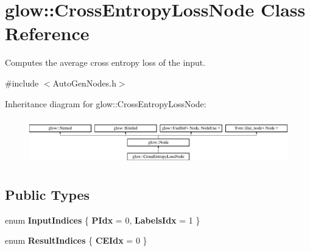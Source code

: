 \hypertarget{classglow_1_1_cross_entropy_loss_node}{}\section{glow\+:\+:Cross\+Entropy\+Loss\+Node Class Reference}
\label{classglow_1_1_cross_entropy_loss_node}


Computes the average cross entropy loss of the input.  




{\ttfamily \#include $<$Auto\+Gen\+Nodes.\+h$>$}

Inheritance diagram for glow\+:\+:Cross\+Entropy\+Loss\+Node\+:\begin{figure}[H]
\begin{center}
\leavevmode
\includegraphics[height=2.028986cm]{classglow_1_1_cross_entropy_loss_node}
\end{center}
\end{figure}
\subsection*{Public Types}
\begin{DoxyCompactItemize}
\item 
\mbox{\label{classglow_1_1_cross_entropy_loss_node_a510f21a6d6cd731f0642922e3e361e57}} 
enum {\bfseries Input\+Indices} \{ {\bfseries P\+Idx} = 0, 
{\bfseries Labels\+Idx} = 1
 \}
\item 
\mbox{\label{classglow_1_1_cross_entropy_loss_node_a0d6ba0f361740b2e6dc3e2f84e57c187}} 
enum {\bfseries Result\+Indices} \{ {\bfseries C\+E\+Idx} = 0
 \}
\end{DoxyCompactItemize}
